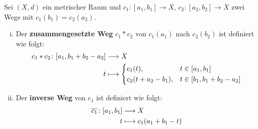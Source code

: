 \begin{definition}
\label{def:2.5}
	Sei $(X,d)$ ein metrischer Raum und $c_1 \colon [a_1,b_1] \rightarrow X$, $c_2 \colon [a_2,b_2] \rightarrow X$ zwei Wege mit $c_1(b_1) = c_2(a_2)$.
	\begin{enumerate}[(i)]
		\item Der \textbf{zusammengesetzte Weg} $c_1 * c_2$ von $c_1(a_1)$ nach $c_2(b_2)$ ist definiert wie folgt: 
		\begin{align*}
			c_1 * c_2\colon [a_1,b_1+b_2-a_2] &\longrightarrow X \\
			t &\longmapsto \begin{dcases}
				c_1(t), & t \in [a_1,b_1] \\
				c_2(t+a_2-b_1), & t \in [b_1,b_1+b_2-a_2]
			\end{dcases}
		\end{align*}
		\item Der \textbf{inverse Weg} von $c_1$ ist definiert wie folgt: 
		\begin{align*}
			\overline{c_1}\colon [a_1,b_1] &\longrightarrow X \\
			t &\longmapsto c_1(a_1+b_1-t)
		\end{align*}
	\end{enumerate}
\end{definition}
\newpage
